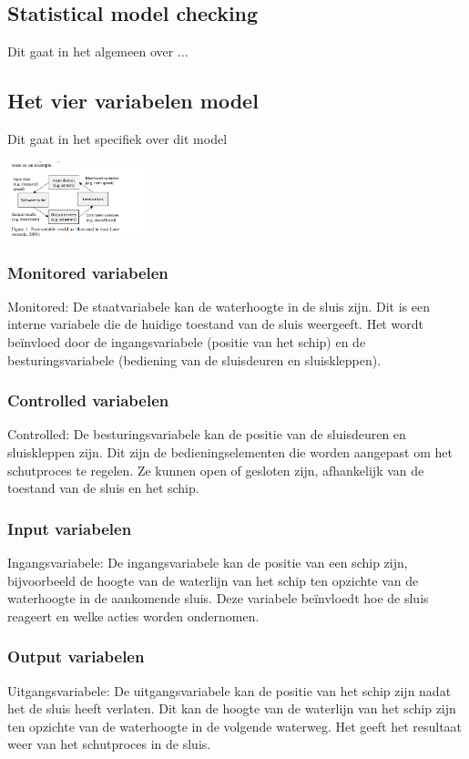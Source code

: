 \documentclass{article}
\begin{document}
	\subsection{Statistical model checking}
	Dit gaat in het algemeen over ...
	
	\subsection{Het vier variabelen model}
	Dit gaat in het specifiek  over  dit model
	
	\includegraphics[width=4cm]{4varmodel.png} %
	\subsubsection{Monitored variabelen}
	Monitored: De staatvariabele kan de waterhoogte in de sluis zijn. Dit is een interne variabele die de huidige toestand van de sluis weergeeft. Het wordt beïnvloed door de ingangsvariabele (positie van het schip) en de besturingsvariabele (bediening van de sluisdeuren en sluiskleppen).
	\subsubsection{Controlled variabelen}
		Controlled: De besturingsvariabele kan de positie van de sluisdeuren en sluiskleppen zijn. Dit zijn de bedieningselementen die worden aangepast om het schutproces te regelen. Ze kunnen open of gesloten zijn, afhankelijk van de toestand van de sluis en het schip.
	\subsubsection{Input variabelen}
	Ingangsvariabele: De ingangsvariabele kan de positie van een schip zijn, bijvoorbeeld de hoogte van de waterlijn van het schip ten opzichte van de waterhoogte in de aankomende sluis. Deze variabele beïnvloedt hoe de sluis reageert en welke acties worden ondernomen.
	\subsubsection{Output variabelen}
	Uitgangsvariabele: De uitgangsvariabele kan de positie van het schip zijn nadat het de sluis heeft verlaten. Dit kan de hoogte van de waterlijn van het schip zijn ten opzichte van de waterhoogte in de volgende waterweg. Het geeft het resultaat weer van het schutproces in de sluis.
\end{document}
